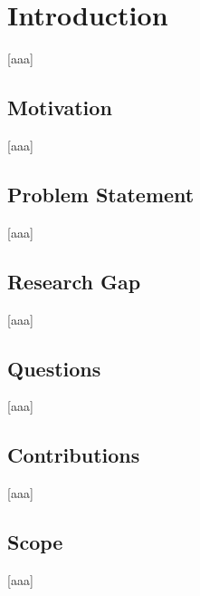 \chapter{Introduction} \label{sec:Introduction}
    [aaa]

\section{Motivation} \label{sec:Motivation}
    [aaa]

\section{Problem Statement} \label{sec:Problem Statement}
    [aaa]

\section{Research Gap} \label{sec:Research Gap}
    [aaa]

\section{Questions} \label{sec:Questions}
    [aaa]

\section{Contributions} \label{sec:Contributions}
    [aaa]

\section{Scope} \label{sec:Scope}
    [aaa]

